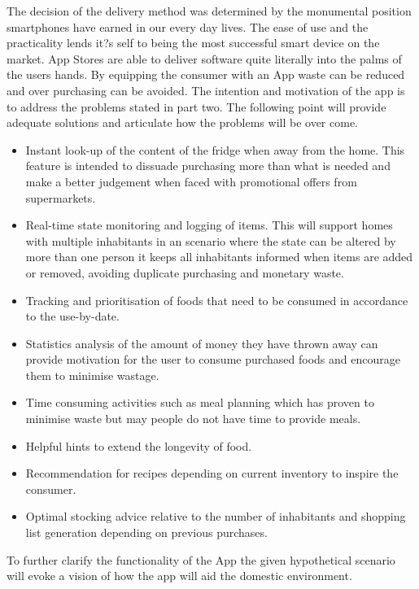 \documentclass[a4paper, 11pt]{article}
\begin{document}
The decision of the delivery method was determined by the monumental position smartphones have earned in our every day lives. The ease of use and the practicality lends it?s self to being the most successful smart device on the market. App Stores are able to deliver software quite literally into the palms of the users hands. By equipping the consumer with an App waste can be reduced and over purchasing can be avoided. The intention and motivation of the app is to address the problems stated in part two. The following point will provide adequate solutions and articulate how the problems will be over come.


\begin{itemize}
  \item Instant look-up of the content of the fridge when away from the home. This feature is intended to dissuade purchasing more than what is needed and make a better judgement when faced with promotional offers from supermarkets.
  \item Real-time state monitoring and logging of items. This will support homes with multiple inhabitants in an scenario where the state can be altered by more than one person it keeps all inhabitants informed when items are added or removed, avoiding duplicate purchasing and monetary waste.
  \item Tracking and prioritisation of foods that need to be consumed in accordance to the use-by-date. 
   \item Statistics analysis of the amount of money they have thrown away can provide motivation for the user to consume purchased foods and encourage them to minimise wastage.
    \item Time consuming activities such as meal planning which has proven to minimise waste but may people do not have time to provide meals. 
     \item Helpful hints to extend the longevity of food. 
\item Recommendation for recipes depending on current inventory to inspire the consumer.
\item Optimal stocking advice relative to the number of inhabitants and shopping list generation depending on previous purchases. 
 \end{itemize}

To further clarify the functionality of the App the given hypothetical scenario will evoke a vision of how the app will aid the domestic environment. 
\end{document}
